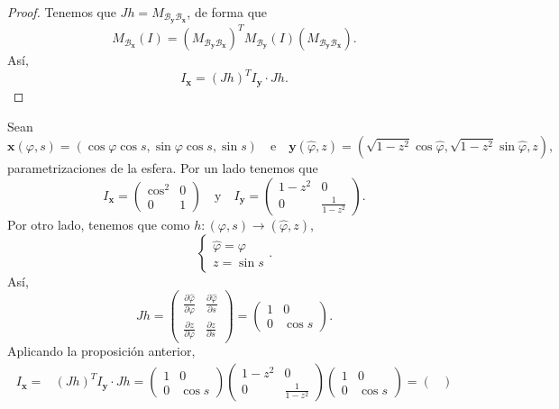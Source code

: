 \begin{proof}
Tenemos que $\displaystyle J h = M_{\mathcal{B}_{ \textbf{y} }\mathcal{B}_{ \textbf{x} }}  $, de forma que 
\[M_{\mathcal{B}_{ \textbf{x} }}\left(I\right)=\left(M_{ \mathcal{B}_{ \textbf{y} }\mathcal{B}_{ \textbf{x} }}\right)^{T}M_{ \mathcal{B}_{ \textbf{y} }}\left(I\right)\left(M_{\mathcal{B} _{ \textbf{y} }\mathcal{B} _{ \textbf{x} }}\right) .\]
Así, 
\[I_{ \textbf{x} }= \left(Jh\right)^{T}I _{ \textbf{y} } \cdot Jh.\]
\end{proof}
\begin{eg}[Esfera]
Sean  
\[\textbf{x} \left(\varphi, s\right)=\left(\cos\varphi\cos s, \sin\varphi \cos s, \sin s\right)\quad \text{e}\quad  \textbf{y} \left(\hat{\varphi}, z\right)=\left(\sqrt{1-z^{2}}\cos\hat{\varphi}, \sqrt{1-z^{2}}\sin\hat{\varphi }, z\right) ,\]
parametrizaciones de la esfera. Por un lado tenemos que 
\[I _{ \textbf{x} }=\begin{pmatrix} \cos ^{2} & 0 \\ 0 & 1 \end{pmatrix}\quad \text{y} \quad I_{ \textbf{y} }=\begin{pmatrix} 1-z^{2} & 0 \\ 0 & \frac{1}{1-z^{2}} \end{pmatrix} .\]
Por otro lado, tenemos que como $\displaystyle h: \left(\varphi, s\right)\to \left(\hat{\varphi }, z\right) $, 
\[
\begin{cases}
\hat{\varphi} = \varphi \\
z = \sin s
\end{cases}
.\]
Así, 
\[Jh = \begin{pmatrix} \frac{\partial \hat{\varphi}}{\partial \varphi} & \frac{\partial \hat{\varphi}}{\partial s} \\ \frac{\partial z}{\partial \varphi} & \frac{\partial z}{\partial s} \end{pmatrix}=\begin{pmatrix} 1 & 0 \\ 0 & \cos s \end{pmatrix} .\]
Aplicando la proposición anterior, 
\[
\begin{split}
	I _{ \textbf{x} }= &\left(Jh\right)^{T} I_{ \textbf{y} } \cdot Jh = \begin{pmatrix} 1 & 0 \\ 0 & \cos s \end{pmatrix}\begin{pmatrix} 1-z^{2} & 0 \\ 0 & \frac{1}{1-z^{2}}  \end{pmatrix}\begin{pmatrix} 1 & 0 \\ 0 & \cos s \end{pmatrix}=\begin{pmatrix}  \end{pmatrix} \\

\end{split}\]
\end{eg}

